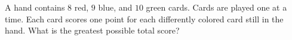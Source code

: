 A hand contains $8$ red, $9$ blue, and $10$ green cards. Cards are played one at a time. Each card scores one point for each differently colored card still in the hand. What is the greatest possible total score?
